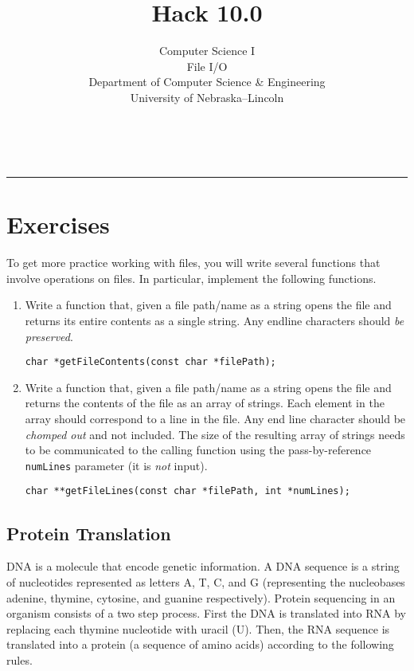 \documentclass[12pt]{scrartcl}
\title{Hack 10.0}\let\Title\@title
\subtitle{Computer Science I\\
File I/O\\
{\small
\vskip1cm
Department of Computer Science \& Engineering \\
University of Nebraska--Lincoln}
\vskip-2cm}
\date{~}
\begin{document}
\maketitle

\hrule



\section*{Exercises}

To get more practice working with files, you will write several 
functions that involve operations on files.  In particular, implement
the following functions.

\begin{enumerate}

  \item Write a function that, given a file path/name as a string opens
  the file and returns its entire contents as a single string.  Any endline
  characters should \emph{be preserved}.
  
  \texttt{char *getFileContents(const char *filePath);}

  \item Write a function that, given a file path/name as a string opens
  the file and returns the contents of the file as an array of strings.
  Each element in the array should correspond to a line in the file.
  Any end line character should be \emph{chomped out} and not included.
  The size of the resulting array of strings needs to be communicated to the calling
  function using the pass-by-reference \texttt{numLines} parameter
  (it is \emph{not} input).

  \texttt{char **getFileLines(const char *filePath, int *numLines);}

\end{enumerate}

\subsection*{Protein Translation}

DNA is a molecule that encode genetic information.  A DNA sequence is 
a string of nucleotides represented as letters A, T, C, and G (representing
the nucleobases adenine, thymine, cytosine, and guanine respectively).  
Protein sequencing in an organism consists of a two step process.  First 
the DNA is translated into RNA by replacing each thymine nucleotide with 
uracil (U).  Then, the RNA sequence is translated into a protein (a sequence
of amino acids) according to the following rules.
\end{document}
